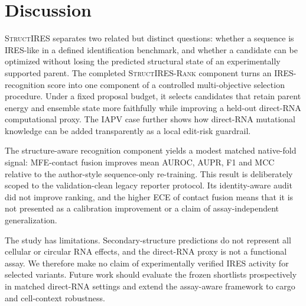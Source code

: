\section{Discussion}

\textsc{StructIRES} separates two related but distinct questions: whether a
sequence is IRES-like in a defined identification benchmark, and whether a
candidate can be optimized without losing the predicted structural state of an
experimentally supported parent. The completed \textsc{StructIRES-Rank}
component turns an IRES-recognition score into one component of a controlled
multi-objective selection procedure. Under a fixed proposal budget, it selects
candidates that retain parent energy and ensemble state more faithfully while
improving a held-out direct-RNA computational proxy. The IAPV case further
shows how direct-RNA mutational knowledge can be added transparently as a local
edit-risk guardrail.

The structure-aware recognition component yields a modest matched native-fold
signal: MFE-contact fusion improves mean AUROC, AUPR, F1 and MCC relative to
the author-style sequence-only re-training. This result is deliberately scoped
to the validation-clean legacy reporter protocol. Its identity-aware audit did
not improve ranking, and the higher ECE of contact fusion means that it is not
presented as a calibration improvement or a claim of assay-independent
generalization.

The study has limitations. Secondary-structure predictions do not represent
all cellular or circular RNA effects, and the direct-RNA proxy is not a
functional assay. We therefore make no claim of experimentally verified IRES
activity for selected variants. Future work should evaluate the frozen
shortlists prospectively in matched direct-RNA settings and extend the
assay-aware framework to cargo and cell-context robustness.
